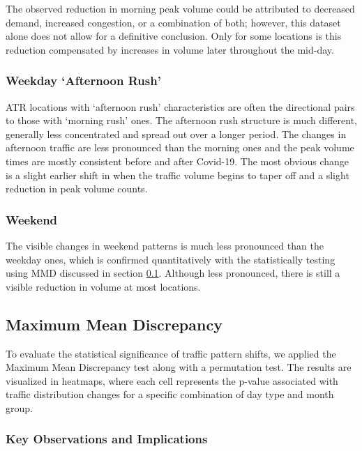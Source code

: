 \documentclass{article}
\begin{document}
The observed reduction in morning peak volume could be attributed to decreased demand, increased congestion, or a combination of both; however, this dataset alone does not allow for a definitive conclusion. Only for some locations is this reduction compensated by increases in volume later throughout the mid-day.

\subsubsection{Weekday `Afternoon Rush'}

ATR locations with `afternoon rush' characteristics are often the directional pairs to those with `morning rush' ones. The afternoon rush structure is much different, generally less concentrated and spread out over a longer period. The changes in afternoon traffic are less pronounced than the morning ones and the peak volume times are mostly consistent before and after Covid-19. The most obvious change is a slight earlier shift in when the traffic volume begins to taper off and a slight reduction in peak volume counts.

\subsubsection{Weekend}

The visible changes in weekend patterns is much less pronounced than the weekday ones, which is confirmed quantitatively with the statistically testing using MMD discussed in section \ref{sec:mmd_results}. Although less pronounced, there is still a visible reduction in volume at most locations. 

\subsection{Maximum Mean Discrepancy} \label{sec:mmd_results}

To evaluate the statistical significance of traffic pattern shifts, we applied the Maximum Mean Discrepancy test along with a permutation test. The results are visualized in heatmaps, where each cell represents the p-value associated with traffic distribution changes for a specific combination of day type and month group.

\subsubsection{Key Observations and Implications}
\end{document}
